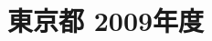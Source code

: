 \documentclass[../../hsm_tok_q.tex]{subfiles}
\begin{document}
    \section{東京都 2009年度}
    \subsection{　}
    
    \newpage
    \subsection{　}
    
    \newpage
    \subsection{　}
    
    \newpage
    \subsection{　}
    
    \newpage
    \subsection{　}
    
\end{document}
